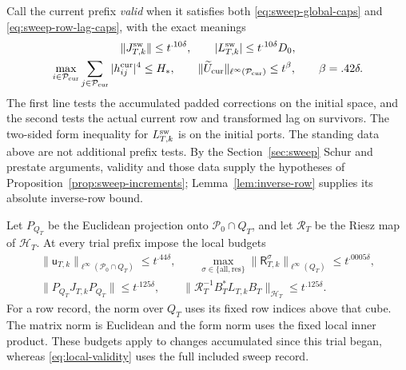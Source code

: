 Call the current prefix \emph{valid} when it satisfies both
\eqref{eq:sweep-global-caps} and \eqref{eq:sweep-row-lag-caps}, with
the exact meanings
\begin{equation}\label{eq:local-validity}
 \begin{gathered}
 \|J^{\rm sw}_{T,k}\|\le t^{.10\delta},\qquad
 |L^{\rm sw}_{T,k}|\le t^{.10\delta}D_0,\\
 \max_{i\in\mathcal P_{\rm cur}}
       \sum_{j\in\mathcal P_{\rm cur}}|h^{\rm cur}_{ij}|^4\le H_*,
 \qquad
 \|\widetilde U_{\rm cur}\|_{\ell^\infty(\mathcal P_{\rm cur})}
       \le t^\beta,\qquad \beta=.42\delta.
 \end{gathered}
\end{equation}
The first line tests the accumulated padded corrections on the initial
space, and the second tests the actual current row and transformed lag
on survivors.  The two-sided form inequality for \(L^{\rm sw}_{T,k}\)
is on the initial ports.  The standing data above are not additional
prefix tests.  By the Section~\ref{sec:sweep} Schur and prestate
arguments, validity and those data supply the hypotheses of
Proposition~\ref{prop:sweep-increments}; Lemma~\ref{lem:inverse-row}
supplies its absolute inverse-row bound.

Let \(P_{Q_T}\) be the Euclidean projection onto
\(\mathcal P_0\cap Q_T\), and let \(\mathcal R_T\) be the Riesz map of
\(\mathcal H_T\).  At every trial prefix impose the local budgets
\begin{equation}\label{eq:local-budgets}
 \begin{gathered}
 \|\mathsf u_{T,k}\|_{\ell^\infty(\mathcal P_0\cap Q_T)}
       \le t^{.44\delta},\qquad
 \max_{\sigma\in\{\mathrm{all},\mathrm{res}\}}
       \|\mathsf R^\sigma_{T,k}\|_{\ell^\infty(Q_T)}
       \le t^{.0005\delta},\\
 \|P_{Q_T}J_{T,k}P_{Q_T}\|\le t^{.125\delta},\qquad
 \|\mathcal R_T^{-1}B_T^*L_{T,k}B_T\|_{\mathcal H_T}
       \le t^{.125\delta}.
 \end{gathered}
\end{equation}
For a row record, the norm over \(Q_T\) uses its fixed row indices above
that cube.  The matrix norm is Euclidean and the form norm uses the
fixed local inner product.  These budgets apply to changes accumulated
since this trial began, whereas \eqref{eq:local-validity} uses the full
included sweep record.

